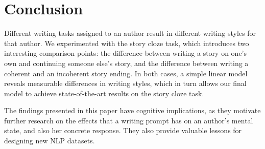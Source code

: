\documentclass[11pt,a4paper]{article}
\newcommand{\isectionb}[1]{\section{#1}\label{ssec:#1}}
\newcommand{\resolved}[1]{}
\newcommand{\nascomment}[1]{{\color{blue}\textsc{[#1 --nas]}}}
\renewcommand{\nascomment}[1]{}
\begin{document}
\isectionb{Conclusion}

Different writing tasks assigned to an author result in different
writing styles for that author.
We experimented with the story cloze task, which introduces two interesting comparison points: %
 the difference between writing a story on one's own and continuing someone else's story,
 and the difference between writing a coherent and an incoherent story ending.
In both cases, a simple linear model reveals measurable differences in writing styles, %
which in turn allows our final 
model to achieve state-of-the-art results on the story cloze task.

The findings presented in this paper have  cognitive implications, as
they motivate further research on the effects that a writing
prompt has on an author's mental state, and also her concrete response.
They also provide valuable lessons for designing new NLP datasets.
 \resolved{\nascomment{drop the last sentence, it makes this paper seem less
  complete} Future work will include testing whether other similar writing tasks, such as fake news, also impose their own unique and identifiable style on their authors.}




%
%



\end{document}
